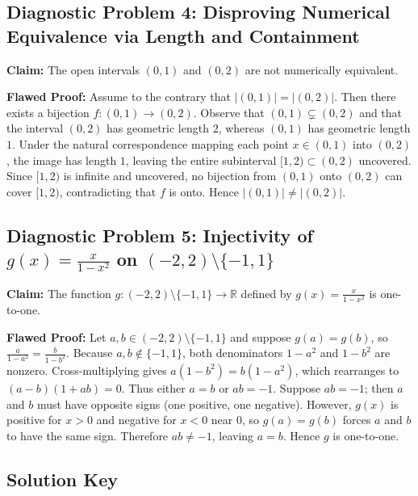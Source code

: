 \documentclass[11pt, letterpaper]{article}
\theoremstyle{definition}
\theoremstyle{remark}
\begin{document}
\subsection{Diagnostic Problem 4: Disproving Numerical Equivalence via Length and Containment}

\textbf{Claim:} The open intervals $(0, 1)$ and $(0, 2)$ are not numerically equivalent.

\textbf{Flawed Proof:}
Assume to the contrary that $|(0, 1)| = |(0, 2)|$. Then there exists a bijection $f : (0, 1) \to (0, 2)$. Observe that $(0, 1) \subsetneq (0, 2)$ and that the interval $(0, 2)$ has geometric length $2$, whereas $(0, 1)$ has geometric length $1$. Under the natural correspondence mapping each point $x \in (0, 1)$ into $(0, 2)$, the image has length $1$, leaving the entire subinterval $[1, 2) \subset (0, 2)$ uncovered. Since $[1, 2)$ is infinite and uncovered, no bijection from $(0, 1)$ onto $(0, 2)$ can cover $[1, 2)$, contradicting that $f$ is onto. Hence $|(0, 1)| \neq |(0, 2)|$.

\subsection{Diagnostic Problem 5: Injectivity of $g(x) = \frac{x}{1 - x^2}$ on $(-2, 2) \setminus \{-1, 1\}$}

\textbf{Claim:} The function $g : (-2, 2) \setminus \{-1, 1\} \to \mathbb{R}$ defined by $g(x) = \frac{x}{1 - x^2}$ is one-to-one.

\textbf{Flawed Proof:}
Let $a, b \in (-2, 2) \setminus \{-1, 1\}$ and suppose $g(a) = g(b)$, so $\frac{a}{1 - a^2} = \frac{b}{1 - b^2}$. Because $a, b \notin \{-1, 1\}$, both denominators $1 - a^2$ and $1 - b^2$ are nonzero. Cross-multiplying gives $a(1 - b^2) = b(1 - a^2)$, which rearranges to $(a - b)(1 + ab) = 0$. Thus either $a = b$ or $ab = -1$. Suppose $ab = -1$; then $a$ and $b$ must have opposite signs (one positive, one negative). However, $g(x)$ is positive for $x > 0$ and negative for $x < 0$ near $0$, so $g(a) = g(b)$ forces $a$ and $b$ to have the same sign. Therefore $ab \neq -1$, leaving $a = b$. Hence $g$ is one-to-one.

\subsection{Solution Key}
\end{document}
